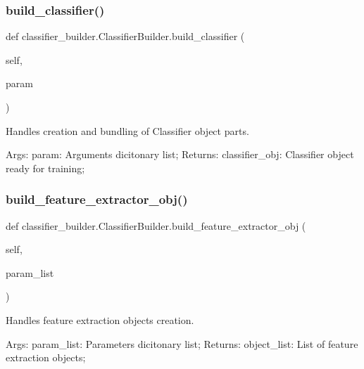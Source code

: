 \subsubsection{\texorpdfstring{build\+\_\+classifier()}{build\_classifier()}}
{\footnotesize\ttfamily def classifier\+\_\+builder.\+Classifier\+Builder.\+build\+\_\+classifier (\begin{DoxyParamCaption}\item[{}]{self,  }\item[{}]{param }\end{DoxyParamCaption})}



Handles creation and bundling of Classifier object parts. 

Args\+: param\+: Arguments dicitonary list; Returns\+: classifier\+\_\+obj\+: Classifier object ready for training; \mbox{\label{classclassifier__builder_1_1_classifier_builder_a11c5a2c5d6d8bf7c820b72f3f90114fe}} 
\subsubsection{\texorpdfstring{build\+\_\+feature\+\_\+extractor\+\_\+obj()}{build\_feature\_extractor\_obj()}}
{\footnotesize\ttfamily def classifier\+\_\+builder.\+Classifier\+Builder.\+build\+\_\+feature\+\_\+extractor\+\_\+obj (\begin{DoxyParamCaption}\item[{}]{self,  }\item[{}]{param\+\_\+list }\end{DoxyParamCaption})}



Handles feature extraction objects creation. 

Args\+: param\+\_\+list\+: Parameters dicitonary list; Returns\+: object\+\_\+list\+: List of feature extraction objects; \mbox{\label{classclassifier__builder_1_1_classifier_builder_a1c124dd02af8615f45da7099e53a06bc}} 
